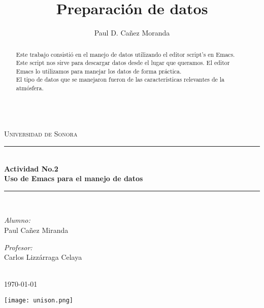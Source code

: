 \documentclass[a4paper]{article}
\title{Preparación de datos}
\author{Paul D. Cañez Moranda}
\begin{document}
\begin{titlepage}
\newcommand{\HRule}{\rule{\linewidth}{0.5mm}}
\center
\textsc{\LARGE Universidad de Sonora}\\[1cm]
\HRule \\[0.4cm]
{ \huge \bfseries Actividad No.2 }\\[0.4cm]
{ \huge \bfseries Uso de Emacs para el manejo de datos }\\[0.4cm]
\HRule \\[1.1cm]
\begin{minipage}{0.4\textwidth}
\begin{flushleft} \large
\emph{Alumno:}\\

Paul Cañez Miranda

\end{flushleft}
\end{minipage}
\begin{minipage}{0.4\textwidth}
\begin{flushright} \large
\emph{Profesor:} \\
Carlos Lizzárraga Celaya 
\end{flushright}
\end{minipage}\\[0.5cm]
{\large \today}\\[1cm] 
\begin{center}
\texttt{[image: unison.png]}
\end{center}
\end{titlepage}

\newpage 
\begin{abstract}
Este trabajo consistió en el manejo de datos utilizando el editor script's en Emacs. Este script nos sirve para descargar datos desde el lugar que queramos. El editor Emacs lo utilizamos para manejar los datos de forma práctica. \\ El tipo de datos que se manejaron fueron de las características relevantes de la atmósfera. \\ \\
\end{abstract}
\end{document}
